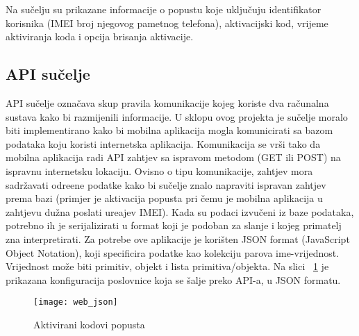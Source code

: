 Na su\v{c}elju su prikazane informacije o popustu koje uklju\v{c}uju identifikator korisnika (IMEI broj njegovog pametnog telefona), aktivacijski kod, vrijeme aktiviranja koda i opcija brisanja aktivacije.

\subsection{API su\v{c}elje}

API su\v{c}elje ozna\v{c}ava skup pravila komunikacije kojeg koriste dva ra\v{c}unalna sustava kako bi razmijenili informacije. U sklopu ovog projekta je su\v{c}elje moralo biti implementirano kako bi mobilna aplikacija mogla komunicirati sa bazom podataka koju koristi internetska aplikacija. Komunikacija se vr\v{s}i tako da mobilna aplikacija radi API zahtjev sa ispravom metodom (GET ili POST) na ispravnu internetsku lokaciju. Ovisno o tipu komunikacije, zahtjev mora sadr\v{z}avati odre\dj ene podatke kako bi su\v{c}elje znalo napraviti ispravan zahtjev prema bazi (primjer je aktivacija popusta pri \v{c}emu je mobilna aplikacija u zahtjevu du\v{z}na poslati ure\dj ajev IMEI). Kada su podaci izvu\v{c}eni iz baze podataka, potrebno ih je serijalizirati u format koji je podoban za slanje i kojeg primatelj zna interpretirati. Za potrebe ove aplikacije je kori\v{s}ten JSON format \cite{json} (JavaScript Object Notation), koji specificira podatke kao kolekciju parova ime-vrijednost. Vrijednost mo\v{z}e biti primitiv, objekt i lista primitiva/objekta. Na slici ~\ref{fig:web_json} je prikazana konfiguracija poslovnice koja se \v{s}alje preko API-a, u JSON formatu.


\begin{figure}[!htbp]
	\begin{center}
 \texttt{[image: web\_json]}
 \caption{Aktivirani kodovi popusta}
 \label{fig:web_json}
	\end{center}
\end{figure}







